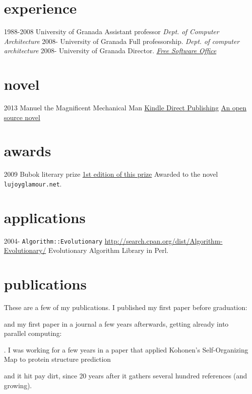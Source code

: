 \documentclass[]{friggeri-cv}
\begin{document}
\section{experience}

\begin{entrylist}
  \entry
    {1988-2008}
    {University of Granada}
    {Assistant professor}
    {\emph{Dept. of Computer Architecture}}
  \entry
    {2008-}
    {University of Granada}
    {Full professorship.}
    {\emph{Dept. of computer architecture}}
    \entry
    {2008-}
    {University of Granada}
    {Director.}
    {\href{http://osl.ugr.es}{\emph{Free Software Office}}}
\end{entrylist}

\section{novel}
\begin{entrylist}
  \entry
    {2013}
    {Manuel the Magnificent Mechanical Man}
    {\href{http://www.amazon.com/dp/B00ED084BK/}{Kindle Direct Publishing}}
    {\href{http://jj.github.io/hoborg}{An open source novel}}
\end{entrylist}

\section{awards}
\begin{entrylist}
 \entry
    {2009}
    {Bubok literary prize}
    {\href{http://cultura.elpais.com/cultura/2009/05/06/actualidad/1241560804_850215.html}{1st
        edition of this prize}}
    {Awarded to the novel {\tt lujoyglamour.net}.}
\end{entrylist}


\section{applications}

\begin{entrylist}
  \entry
    {2004-}
    {{\tt Algorithm::Evolutionary}}
    {\href{http://search.cpan.org/dist/Algorithm-Evolutionary/}{http://search.cpan.org/dist/Algorithm-Evolutionary/}}
    {Evolutionary Algorithm Library in Perl.}

\end{entrylist}

\section{publications}

These are a few of my publications. I published my first paper before
graduation: 

\cite{merelo88} 
and my first paper in a journal a few years
afterwards, getting already into parallel computing:

\cite{parallel90}. 
I was working for a few years in a paper that
applied Kohonen's Self-Organizing Map to protein structure prediction

\cite{jjproteng} 
and it hit pay dirt, since 20 years after it gathers
several hundred references (and growing).

\end{document}
